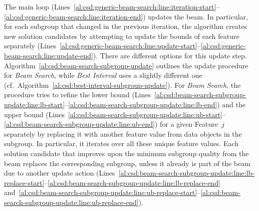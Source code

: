 \documentclass{article}
\theoremstyle{definition}
\begin{document}
The main loop (Lines~\ref{al:csd:generic-beam-search:line:iteration-start}--\ref{al:csd:generic-beam-search:line:iteration-end}) updates the beam.
In particular, for each subgroup that changed in the previous iteration, the algorithm creates new solution candidates by attempting to update the bounds of each feature separately (Lines~\ref{al:csd:generic-beam-search:line:update-start}--\ref{al:csd:generic-beam-search:line:update-end}).
There are different options for this update step.
Algorithm~\ref{al:csd:beam-search-subgroup-update} outlines the update procedure for \emph{Beam Search}, while \emph{Best Interval} uses a slightly different one (cf.~Algorithm~\ref{al:csd:best-interval-subgroup-update}).
For \emph{Beam Search}, the procedure tries to refine the lower bound (Lines~\ref{al:csd:beam-search-subgroup-update:line:lb-start}--\ref{al:csd:beam-search-subgroup-update:line:lb-end}) and the upper bound (Lines~\ref{al:csd:beam-search-subgroup-update:line:ub-start}--\ref{al:csd:beam-search-subgroup-update:line:ub-end}) for a given Feature~$j$ separately by replacing it with another feature value from data objects in the subgroup.
In particular, it iterates over all these unique feature values.
Each solution candidate that improves upon the minimum subgroup quality from the beam replaces the corresponding subgroup, unless it already is part of the beam due to another update action (Lines~\ref{al:csd:beam-search-subgroup-update:line:lb-replace-start}--\ref{al:csd:beam-search-subgroup-update:line:lb-replace-end} and~\ref{al:csd:beam-search-subgroup-update:line:ub-replace-start}--\ref{al:csd:beam-search-subgroup-update:line:ub-replace-end}).
\end{document}

